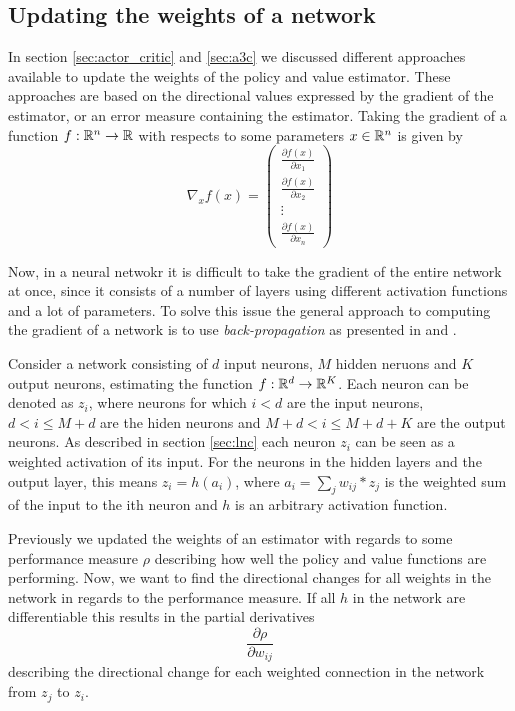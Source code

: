 \documentclass[11pt]{article}
\begin{document}
\subsection{Updating the weights of a network}

In section \ref{sec:actor_critic} and \ref{sec:a3c} we discussed different
approaches available to update the weights of the policy and value estimator.
These approaches are based on the directional values
expressed by the gradient of the estimator, or an error measure containing
the estimator.
Taking the gradient of a function $f : \mathbb{R}^n \to \mathbb{R}$ with respects to
some parameters $x \in \mathbb{R}^n$ is given by
\begin{equation}
    \nabla_x f(x)
    = \begin{pmatrix}
        \frac{\partial f(x)}{\partial x_1}\\
        \frac{\partial f(x)}{\partial x_2}\\
        \vdots\\
        \frac{\partial f(x)}{\partial x_n}
      \end{pmatrix}
\end{equation}

Now, in a neural netwokr it is difficult to take the gradient of the
entire network at once, since it consists of a number of layers
using different activation functions and a lot of parameters.
To solve this issue the general approach to computing the gradient of a network
is to use \textit{back-propagation} as presented in \cite{IgelBackProp}
and \cite{DeepLearningBook}.

Consider a network consisting of $d$ input neurons, $M$ hidden neruons and $K$ output neurons,
estimating the function $f : \mathbb{R}^d \to \mathbb{R}^K$.
Each neuron can be denoted as $z_i$, where neurons for which $i < d$ are the input neurons, $d < i \leq M + d$ are the hiden neurons
and $M + d < i \leq M + d + K$ are the output neurons.
As described in section \ref{sec:lnc} each neuron $z_i$ can be seen as a weighted activation of its input.
For the neurons in the hidden layers and the output layer, this means $z_i = h(a_i)$, where 
$a_i = \sum_{j} w_{ij} * z_{j}$ is the weighted sum of the input to the ith neuron and $h$ is an arbitrary
activation function.

Previously we updated the weights of an estimator with regards to some performance measure $\rho$ 
describing how well the policy and value functions are performing. 
Now, we want to find the directional changes for all weights in the network
in regards to the performance measure.
If all $h$ in the network are differentiable this results in the partial derivatives
\begin{equation}\label{part}
    \frac{\partial \rho}{\partial w_{ij}}
\end{equation}
describing the directional change for each weighted connection in the network from $z_j$ to $z_i$.
\end{document}
